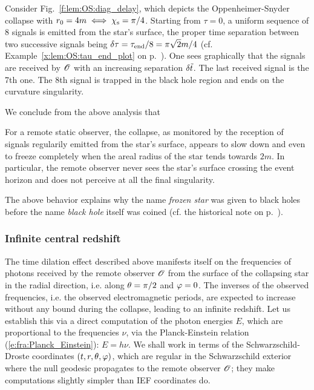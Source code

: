 \begin{example}
Consider Fig.~\ref{f:lem:OS:diag_delay}, which depicts the Oppenheimer-Snyder collapse
with $r_0 = 4 m \iff \chi_{\rm s} = \pi/4$. Starting from $\tau=0$, a uniform sequence of 8 signals is emitted from the star's surface, the proper time separation between two successive signals being
$\delta\tau = \tau_{\rm end}/8 = \pi\sqrt{2} m / 4$ (cf. Example~\ref{x:lem:OS:tau_end_plot} on
p.~\pageref{x:lem:OS:tau_end_plot}). One sees graphically that the signals are received by $\mathscr{O}$
with an increasing separation $\delta{\tilde t}$. The last received signal is the 7th one. The 8th signal is trapped in the black hole region and ends on the curvature singularity.
\end{example}

We conclude from the above analysis that
\begin{greybox}
For a remote static observer, the collapse, as monitored by the reception of signals regularily emitted from the star's surface,
appears to slow down and even to freeze completely when the areal radius
of the star tends towards $2 m$. In particular, the remote observer never sees the
star's surface crossing the event horizon and does not perceive at all the final singularity.
\end{greybox}

\begin{hist}
The above behavior explains why the name \emph{frozen star}
was given to black holes before the name \emph{black hole} itself was coined
(cf. the historical note on p.~\pageref{h:glo:black_hole_name}).
\end{hist}

\subsubsection{Infinite central redshift}

The time dilation effect described above manifests itself on the frequencies of photons
received by the remote observer $\mathscr{O}$ from the surface of the collapsing star
in the radial direction, i.e. along $\theta=\pi/2$ and $\varphi=0$.
The inverses of the observed frequencies, i.e. the observed electromagnetic periods, are expected to increase without any bound during the collapse, leading to an infinite redshift.
Let us establish this via a direct computation of the photon energies $E$, which are proportional
to the frequencies $\nu$, via the Planck-Einstein relation (\ref{e:fra:Planck_Einstein}): $E = h\nu$.
We shall work in terms of the Schwarzschild-Droste
coordinates $(t,r,\theta,\varphi)$, which are regular in the Schwarzschild exterior where
the null geodesic propagates to the remote observer $\mathscr{O}$; they
make computations slightly simpler than IEF coordinates do.

